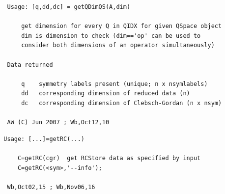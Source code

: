 \documentclass[twoside,12pt]{article}
\begin{document}
\pagebreak[3]



\begin{verbatim}
   Usage: [q,dd,dc] = getQDimQS(A,dim)
 
       get dimension for every Q in QIDX for given QSpace object
       dim is dimension to check (dim=='op' can be used to
       consider both dimensions of an operator simultaneously)
 
   Data returned
 
       q    symmetry labels present (unique; n x nsymlabels)
       dd   corresponding dimension of reduced data (n)
       dc   corresponding dimension of Clebsch-Gordan (n x nsym)
 
   AW (C) Jun 2007 ; Wb,Oct12,10
\end{verbatim}

\pagebreak[3]



\begin{verbatim}
  Usage: [...]=getRC(...)
 
      C=getRC(cgr)  get RCStore data as specified by input
      C=getRC(<sym>,'--info');
 
   Wb,Oct02,15 ; Wb,Nov06,16
\end{verbatim}

\pagebreak[3]


\end{document}
